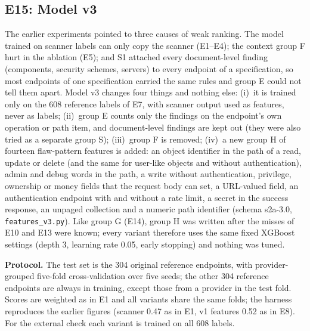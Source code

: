 \documentclass[conference]{IEEEtran}
\begin{document}
\subsection{E15: Model v3}
\label{sec:e15}
The earlier experiments pointed to three causes of weak ranking. The model trained on scanner labels can only copy the scanner (E1--E4); the context group F hurt in the ablation (E5); and S1 attached every document-level finding (components, security schemes, servers) to every endpoint of a specification, so most endpoints of one specification carried the same rules and group E could not tell them apart. Model v3 changes four things and nothing else:
(i)~it is trained only on the 608 reference labels of E7, with scanner output used as features, never as labels;
(ii)~group E counts only the findings on the endpoint's own operation or path item, and document-level findings are kept out (they were also tried as a separate group S);
(iii)~group F is removed;
(iv)~a new group H of fourteen flaw-pattern features is added: an object identifier in the path of a read, update or delete (and the same for user-like objects and without authentication), admin and debug words in the path, a write without authentication, privilege, ownership or money fields that the request body can set, a URL-valued field, an authentication endpoint with and without a rate limit, a secret in the success response, an unpaged collection and a numeric path identifier (schema s2a-3.0, \texttt{features\_v3.py}).
Like group G (E14), group H was written after the misses of E10 and E13 were known; every variant therefore uses the same fixed XGBoost settings (depth 3, learning rate 0.05, early stopping) and nothing was tuned.

\textbf{Protocol.} The test set is the 304 original reference endpoints, with provider-grouped five-fold cross-validation over five seeds; the other 304 reference endpoints are always in training, except those from a provider in the test fold. Scores are weighted as in E1 and all variants share the same folds; the harness reproduces the earlier figures (scanner 0.47 as in E1, v1 features 0.52 as in E8). For the external check each variant is trained on all 608 labels.
\end{document}
